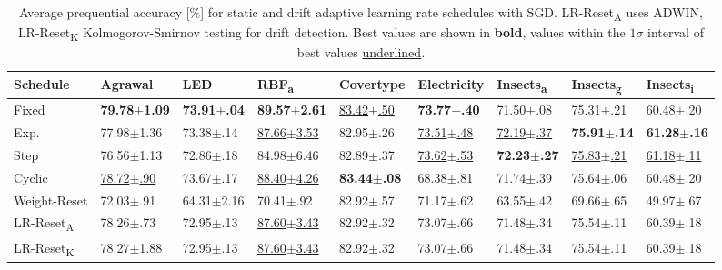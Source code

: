 \documentclass{article} %
\begin{document}
\begin{table}[ht]
   \centering
   \small
   \caption{Average prequential accuracy [\%] for static and drift adaptive learning rate schedules with SGD. LR-Reset\textsubscript{A} uses ADWIN, LR-Reset\textsubscript{K} Kolmogorov-Smirnov testing for drift detection. Best values are shown in \textbf{bold}, values within the $1\sigma$ interval of best values \underline{underlined}.}
   \begin{tabular}{lllllllll}
      \toprule
      Schedule                  & Agrawal                   & LED                     & RBF\textsubscript{a}       & Covertype                 & Electricity               & Insects\textsubscript{a}  & Insects\textsubscript{g}  & Insects\textsubscript{i}  \\
      \midrule

      Fixed                     & \bfseries 79.78$\pm$1.09  & \bfseries 73.91$\pm$.04 & \bfseries 89.57$\pm$2.61   & \underline{83.42$\pm$.50} & \bfseries 73.77$\pm$.40   & 71.50$\pm$.08             & 75.31$\pm$.21             & 60.48$\pm$.20             \\
      Exp.                      & 77.98$\pm$1.36            & 73.38$\pm$.14           & \underline{87.66$\pm$3.53} & 82.95$\pm$.26             & \underline{73.51$\pm$.48} & \underline{72.19$\pm$.37} & \bfseries 75.91$\pm$.14   & \bfseries 61.28$\pm$.16   \\
      Step                      & 76.56$\pm$1.13            & 72.86$\pm$.18           & 84.98$\pm$6.46             & 82.89$\pm$.37             & \underline{73.62$\pm$.53} & \bfseries 72.23$\pm$.27   & \underline{75.83$\pm$.21} & \underline{61.18$\pm$.11} \\
      Cyclic                    & \underline{78.72$\pm$.90} & 73.67$\pm$.17           & \underline{88.40$\pm$4.26} & \bfseries 83.44$\pm$.08   & 68.38$\pm$.81             & 71.74$\pm$.39             & 75.64$\pm$.06             & 60.48$\pm$.20             \\
      Weight-Reset              & 72.03$\pm$.91             & 64.31$\pm$2.16          & 70.41$\pm$.92              & 82.92$\pm$.57             & 71.17$\pm$.62             & 63.55$\pm$.42             & 69.66$\pm$.65             & 49.97$\pm$.67             \\
      LR-Reset\textsubscript{A} & 78.26$\pm$.73             & 72.95$\pm$.13           & \underline{87.60$\pm$3.43} & 82.92$\pm$.32             & 73.07$\pm$.66             & 71.48$\pm$.34             & 75.54$\pm$.11             & 60.39$\pm$.18             \\
      LR-Reset\textsubscript{K} & 78.27$\pm$1.88            & 72.95$\pm$.13           & \underline{87.60$\pm$3.43} & 82.92$\pm$.32             & 73.07$\pm$.66             & 71.48$\pm$.34             & 75.54$\pm$.11             & 60.39$\pm$.18             \\
      \bottomrule
   \end{tabular}
   \label{tab:lr_resetting}
\end{table}
\end{document}
